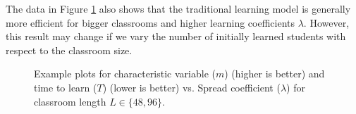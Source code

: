 \documentclass[10pt,a4paper,twoside]{article}
\begin{document}
\noindent The data in Figure \ref{fig:TTL and m vs lambda} also shows that the traditional learning model is generally more efficient for bigger classrooms and higher learning coefficients $\lambda$. However, this result may change if we vary the number of initially learned students with respect to the classroom size.
\begin{figure}[htbp!]
  \centering
  \quad %
  \quad %

  \quad %

  \caption{Example plots for characteristic variable ($m$) (higher is better) and time to learn ($T$) (lower is better) vs. Spread coefficient ($\lambda$) for classroom length $L \in \lbrace 48,96 \rbrace$.}
  \label{fig:TTL and m vs lambda}
\end{figure}
\end{document}
